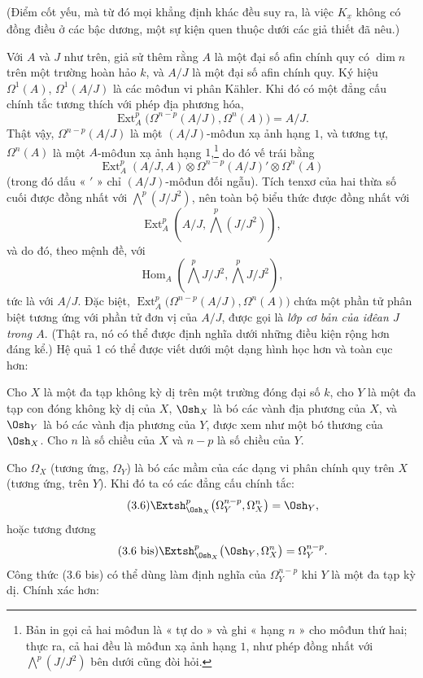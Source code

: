 (Điểm cốt yếu, mà từ đó mọi khẳng định khác đều suy ra, là việc
$K_{\underline{x}}$ không có đồng điều ở các bậc dương, một sự kiện quen thuộc dưới các giả thiết đã nêu.)

 Với $A$ và $J$ như trên, giả sử thêm rằng
$A$ là một đại số afin chính quy có $\dim n$ trên một trường hoàn hảo $k$, và
$A/J$ là một đại số afin chính quy. Ký hiệu $\Omega^{1}(A)$,
$\Omega^{1}(A/J)$ là các môđun vi phân Kähler. Khi đó có một
đẳng cấu chính tắc tương thích với phép địa phương hóa,
\begin{equation}\tag{3.5}
  \operatorname{Ext}_{A}^{p}\bigl(\Omega^{n-p}(A/J),\Omega^{n}(A)\bigr)=A/J.
\end{equation}
Thật vậy, $\Omega^{n-p}(A/J)$ là một $(A/J)$-môđun xạ ảnh hạng $1$, và tương tự,
$\Omega^{n}(A)$ là một $A$-môđun xạ ảnh hạng $1$,\footnote{Bản in gọi
cả hai môđun là « tự do » và ghi « hạng $n$ » cho môđun thứ hai; thực ra, cả hai
đều là môđun xạ ảnh hạng $1$, như phép đồng nhất với $\bigwedge^{p}(J/J^{2})$ bên dưới cũng đòi hỏi.}
do đó vế trái bằng
\[
  \operatorname{Ext}_{A}^{p}(A/J,A)
  \otimes\Omega^{n-p}(A/J)'\otimes\Omega^{n}(A)
\]
(trong đó dấu « $'$ » chỉ $(A/J)$-môđun đối ngẫu). Tích tenxơ của
hai thừa số cuối được đồng nhất với $\bigwedge^{p}(J/J^{2})$,
nên toàn bộ biểu thức
được đồng nhất với
\[
  \operatorname{Ext}_{A}^{p}\!\left(A/J,\bigwedge^{p}(J/J^{2})\right),
\]
và do đó, theo mệnh đề, với
\[
  \operatorname{Hom}_{A}\!\left(\bigwedge^{p}J/J^{2},
  \bigwedge^{p}J/J^{2}\right),
\]
tức là với $A/J$. Đặc biệt,
$\operatorname{Ext}_{A}^{p}\bigl(\Omega^{n-p}(A/J),\Omega^{n}(A)\bigr)$ chứa
một phần tử phân biệt tương ứng với phần tử đơn vị của $A/J$, được gọi là
\emph{lớp cơ bản của iđêan $J$ trong $A$}. (Thật ra, nó có thể được
định nghĩa dưới những điều kiện rộng hơn đáng kể.) Hệ quả 1 có thể được viết
dưới một dạng hình học hơn và toàn cục hơn:

 Cho $X$ là một đa tạp không kỳ dị trên một trường đóng
đại số $k$, cho $Y$ là một đa tạp con đóng không kỳ dị của $X$,
$\Osh_X$ là bó các vành địa phương của $X$, và $\Osh_Y$ là bó các vành
địa phương của $Y$, được xem như một bó thương của $\Osh_X$. Cho $n$ là
số chiều của $X$ và $n-p$ là số chiều của $Y$.

Cho $\Omega_X$ (tương ứng, $\Omega_Y$) là bó các mầm của các dạng
vi phân chính quy trên $X$ (tương ứng, trên $Y$). Khi đó ta có các đẳng cấu
chính tắc:
\begin{equation}\tag{3.6}
  \Extsh_{\Osh_X}^{p}\bigl(\Omega_Y^{n-p},\Omega_X^{n}\bigr)=\Osh_Y,
\end{equation}
hoặc tương đương
\begin{equation}\tag{3.6 bis}
  \Extsh_{\Osh_X}^{p}\bigl(\Osh_Y,\Omega_X^{n}\bigr)=\Omega_Y^{n-p}.
\end{equation}
Công thức (3.6 bis) có thể dùng làm định nghĩa của $\Omega_Y^{n-p}$ khi $Y$
là một đa tạp kỳ dị. Chính xác hơn:


